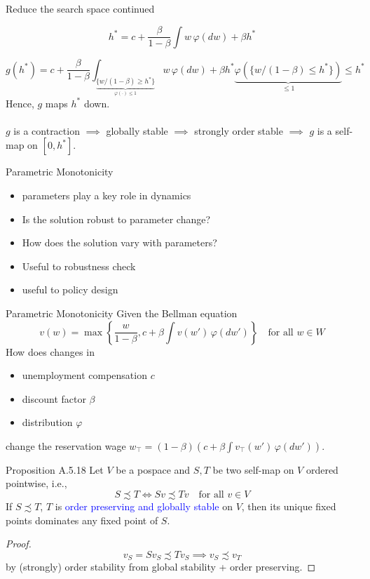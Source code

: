 \begin{frame}{Reduce the search space continued}

$$
 h^* = c + \frac{\beta}{1-\beta}\int w\,\varphi(dw) + \beta h^*
$$

$$
 g(h^*) =c + \frac{\beta}{1-\beta}\int_{\underbrace{\{w/(1-\beta)\ge h^*\}}_{\varphi(\cdot)\le1}}w\,\varphi(dw) + \beta h^*\underbrace{\varphi(\{w/(1-\beta)\le h^*\})}_{\le1}\le h^*
$$
Hence, $g$ maps $h^*$ down.\\
\\
$g$ is a contraction $\implies$ globally stable $\implies$ strongly order stable $\implies$ $g$ is a self-map on $[0, h^*]$.
\end{frame}

\begin{frame}{Parametric Monotonicity}
    \begin{itemize}
        \item parameters play a key role in dynamics
        \item Is the solution robust to parameter change?
        \item  How does the solution vary with parameters?
        \item Useful to robustness check
        \item useful to policy design
    \end{itemize}
\end{frame}

\begin{frame}{Parametric Monotonicity}
        Given the Bellman equation
    $$
    v(w)  = \max\left\{\frac{w}{1-\beta}, c+\beta\int v(w') \,\varphi(dw')\right\}\quad\text{for all $w\in W$}
    $$
    How does changes in 
    \begin{itemize}
        \item unemployment compensation $c$
        \item discount factor $\beta$
        \item distribution $\varphi$
    \end{itemize}
    change the reservation wage $w_\top = (1-\beta) (c+\beta\int v_\top(w')\, \varphi(dw'))$.
\end{frame}

\begin{frame}{Proposition A.5.18}
Let $V$ be a pospace and $S,T$ be two self-map on $V$ ordered pointwise, i.e.,
$$
S\precsim T\iff Sv\precsim Tv\quad \text{for all $v\in V$}
$$
If $S\precsim T$, $T$ is \textcolor{blue}{order preserving and globally stable} on $V$, then its unique fixed points dominates any fixed point of $S$.
\begin{proof}
   $$
   v_S = Sv_S\precsim Tv_S\implies v_S\precsim v_T
   $$
   by (strongly) order stability from global stability + order preserving.
\end{proof}
    
\end{frame}

